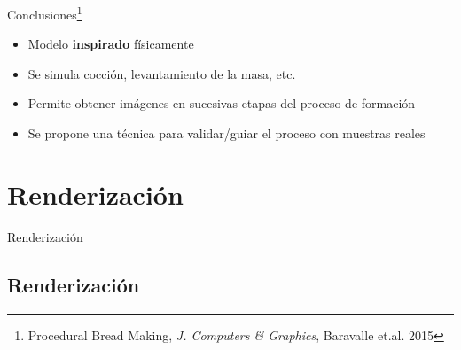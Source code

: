 \documentclass[spanish,unknownkeysallowed,10pt]{beamer}
\begin{document}
\begin{frame}{Conclusiones\footnote{Procedural Bread Making, {\it J. Computers \& Graphics}, Baravalle et.al. 2015}}
\begin{block}{}
\begin{itemize}
\item Modelo \textbf{inspirado} físicamente
\item Se simula cocción, levantamiento de la masa, etc.
\item Permite obtener imágenes en sucesivas etapas del proceso de formación
\item Se propone una técnica para validar/guiar el proceso con muestras reales
\end{itemize}
\end{block}
\end{frame}

\section{Renderización}


\begin{frame}
\begin{block}{}
\begin{center}
\vspace{1cm}
\huge{Renderización}
\vspace{1cm}
\end{center}
\end{block}
\end{frame}


\subsection{Renderización}
\end{document}
